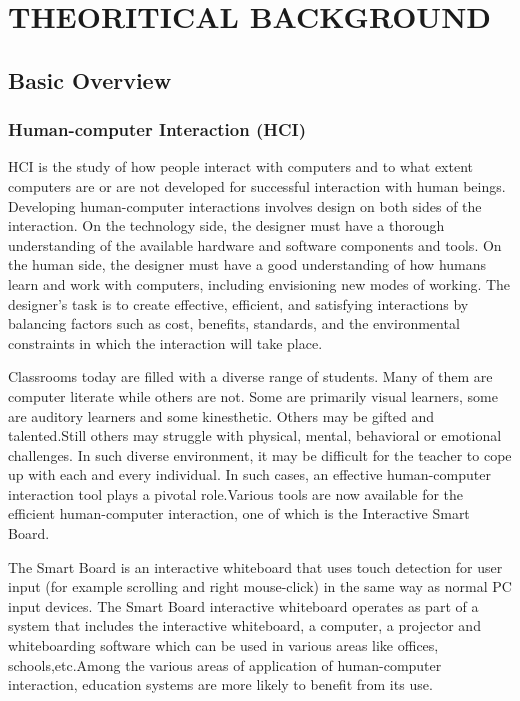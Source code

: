 \documentclass[12pt, a4paper]{article}
\begin{document}
\newpage
\section{THEORITICAL BACKGROUND}
\subsection{Basic Overview}
\subsubsection{Human-computer Interaction (HCI)} 
HCI is the study of how people interact with computers and to what extent computers are or are not developed for successful interaction with human beings. Developing human-computer interactions involves design on both sides of the interaction. On the technology side, the designer must have a thorough understanding of the available hardware and software components and tools. On the human side, the designer must have a good understanding of how humans learn and work with computers, including envisioning new modes of working. The designer's task is to create effective, efficient, and satisfying interactions by balancing factors such as cost, benefits, standards, and the environmental constraints in which the interaction will take place. 

Classrooms today are filled with a diverse range of students. Many of them are computer literate while others are not. Some are primarily visual learners, some are auditory learners and some kinesthetic. Others may be gifted and talented.Still others may struggle with physical, mental, behavioral or emotional challenges. In such diverse environment, it may be difficult for the teacher to cope up with each and every individual. In such cases, an effective human-computer interaction tool plays a pivotal role.Various tools are now available for the efficient human-computer interaction, one of which is the Interactive Smart Board.

The Smart Board is an interactive whiteboard that uses touch detection for user input (for example scrolling and right mouse-click) in the same way as normal PC input devices. The Smart Board interactive whiteboard operates as part of a system that includes the interactive whiteboard, a computer, a projector and whiteboarding software which can be used in various areas like offices, schools,etc.Among the various areas of application of human-computer interaction, education systems are more likely to benefit from its use.
\end{document}
